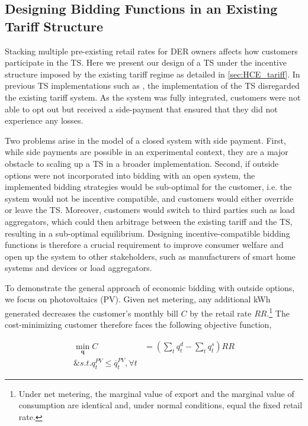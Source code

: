 \documentclass[12pt]{article}{Definitions/mdpi}
\begin{document}
\subsection{Designing Bidding Functions in an Existing Tariff Structure}\label{sec:HCE_design}

Stacking multiple pre-existing retail rates for DER owners affects how customers participate in the TS. Here we present our design of a TS under the incentive structure imposed by the existing tariff regime as detailed in \cref{sec:HCE_tariff}. 
In previous TS implementations such as \citet{hammerstrom_2008}, the implementation of the TS disregarded the existing tariff system. As the system was fully integrated, customers were not able to opt out but received a side-payment that ensured that they did not experience any losses.

Two problems arise in the model of a closed system with side payment. 
First, while side payments are possible in an experimental context, they are a major obstacle to scaling up a TS in a broader implementation. 
Second, if outside options were not incorporated into bidding with an open system, the implemented bidding strategies would be sub-optimal for the customer, i.e. the system would not be incentive compatible, and customers would either override or leave the TS. Moreover, customers would switch to third parties such as load aggregators, which could then arbitrage between the existing tariff and the TS, resulting in a sub-optimal equilibrium.
Designing incentive-compatible bidding functions is therefore a crucial requirement to improve consumer welfare and open up the system to other stakeholders, such as manufacturers of smart home systems and devices or load aggregators.

To demonstrate the general approach of economic bidding with outside options, we focus on photovoltaics (PV).
Given net metering, any additional kWh generated decreases the customer's monthly bill $C$ by the retail rate $RR$.\footnote{Under net metering, the marginal value of export and the marginal value of consumption are identical and, under normal conditions, equal the fixed retail rate.} The cost-minimizing customer therefore faces the following objective function,

\begin{align}
    \min_\mathbf{q} C &= (\sum_t q^d_t - \sum_t q^s_t) RR \\
    \& s.t. q^{PV}_t \leq \overline{q}^{PV}_t, \forall t \nonumber
\end{align}
\end{document}
